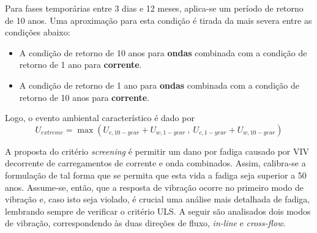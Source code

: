 Para fases temporárias entre 3 dias e 12 meses, aplica-se um período de retorno de 10 anos. Uma aproximação para esta condição é tirada da mais severa entre as condições abaixo:
\begin{itemize}
\item A condição de retorno de 10 anos para \textbf{ondas} combinada com a condição de retorno de 1 ano para \textbf{corrente}.
\item A condição de retorno de 1 ano para \textbf{ondas} combinada com a condição de retorno de 10 anos para \textbf{corrente}.
\end{itemize}

Logo, o evento ambiental característico é dado por
\begin{equation}
U_\mathit{extreme} =  \max\left( U_{c,10-\mathit{year}} + U_{w,1-\mathit{year}} ~,~ U_{c,1-\mathit{year}} + U_{w,10-{year}} \right)
\end{equation}

A proposta do critério \textit{screening} é permitir um dano por fadiga causado por VIV decorrente de carregamentos de corrente e onda combinados. Assim, calibra-se a formulação de tal forma que se permita que esta vida a fadiga seja superior a 50 anos. Assume-se, então, que a resposta de vibração ocorre no primeiro modo de vibração e, caso isto seja violado, é crucial uma análise mais detalhada de fadiga, lembrando sempre de verificar o critério ULS. A seguir são analisados dois modos de vibração, correspondendo às duas direções de fluxo, \textit{in-line} e \textit{cross-flow}.

